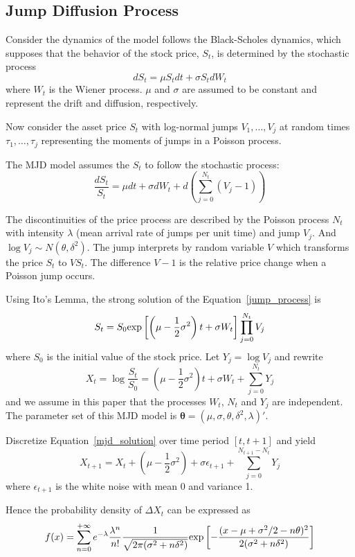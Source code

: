 \documentclass[11pt,reqno,final]{amsart}
\def\exp{\hbox{\rm exp}}
\begin{document}
\subsection{Jump Diffusion Process}
Consider the dynamics of the model follows the Black-Scholes dynamics, which supposes 
that the behavior of the stock price, $S_t$, is determined by the stochastic process
$$
dS_t = \mu S_t dt + \sigma S_t dW_t
$$
where $W_t$ is the Wiener process. $\mu$ and $\sigma$ are assumed to be constant and 
represent the drift and diffusion, respectively. 

Now consider the asset price $S_t$ with log-normal jumps $V_1, \ldots, V_j$ at random times
$\tau_1, \ldots, \tau_j$ representing the moments of jumps in a Poisson process. 

The MJD model assumes the $S_t$ to follow the stochastic process:
\begin{equation} \label{jump_process}
\frac{dS_t}{S_t} = \mu dt + \sigma dW_t + d\left( \sum_{j=0}^{N_t}(V_j -1) \right)
\end{equation}

The discontinuities of the price process are described by the Poisson process $N_t$ 
with intensity $\lambda$ (mean arrival rate of jumps per unit time) and jump $V_j$. 
And $\log V_j \sim N(\theta, \delta^2)$. The jump interprets by random variable $V$ which 
transforms the price $S_t$ to $VS_t$. The difference $V-1$ is the relative price change when 
a Poisson jump occurs. 

Using Ito's Lemma, the strong solution of the Equation~\ref{jump_process} is 
$$
S_t = S_0 \exp\left[\left( \mu - \frac{1}{2} \sigma^2 \right)t + \sigma W_t \right] \prod_{j=0}^{N_t} V_j
$$
where $S_0$ is the initial value of the stock price. Let $Y_j = \log V_j$ and rewrite
\begin{equation} \label{mjd_solution}
X_t = \log\frac{S_t}{S_0} = \left(\mu-\frac{1}{2} \sigma^2 \right)t + \sigma W_t + \sum_{j=0}^{N_t}Y_j
\end{equation}
and we assume in this paper that the processes $W_t$, $N_t$ and $Y_j$ are independent. The parameter set 
of this MJD model is $\mathbf{\theta}=(\mu, \sigma, \theta, \delta^2, \lambda)'$. 

Discretize Equation~\ref{mjd_solution} over time period $[t, t+1]$ and yield
$$
X_{t+1} = X_t + \left( \mu - \frac{1}{2}\sigma^2 \right) + \sigma \epsilon_{t+1} + \sum_{j=0}^{N_{t+1}-N_{t}}Y_j
$$
where $\epsilon_{t+1}$ is the white noise with mean 0 and variance 1.

Hence the probability density of $\Delta X_t$ can be expressed as
$$
f(x) = \sum_{n=0}^{+\infty} e^{-\lambda}\frac{\lambda^n}{n!} \frac{1}{\sqrt{2\pi(\sigma^2+n\delta^2)}} \exp\left[ -\frac{(x-\mu+\sigma^2/2 -n\theta)^2}{2(\sigma^2+n\delta^2)} \right]
$$
\end{document}
